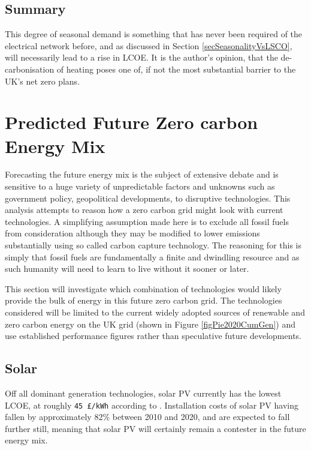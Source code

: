 \documentclass[11pt]{article}
\numberwithin{equation}{section}
\begin{document}
\subsection{Summary}
\label{sec:org576b664}
This degree of seasonal demand is something that has never been required of the electrical network before, and as discussed in Section \ref{secSeasonalityVsLSCO}, will necessarily lead to a rise in LCOE. It is the author's opinion, that the de-carbonisation of heating poses one of, if not the most substantial barrier to the UK's net zero plans.

\section{Predicted Future Zero carbon Energy Mix}
\label{sec:orgb6a7e0b}
Forecasting the future energy mix is the subject of extensive debate and is sensitive to a huge variety of unpredictable factors and unknowns such as government policy, geopolitical developments, to disruptive technologies. This analysis attempts to reason how a zero carbon grid might look with current technologies. A simplifying assumption made here is to exclude all fossil fuels from consideration although they may be modified to lower emissions substantially using so called carbon capture technology. The reasoning for this is simply that fossil fuels are fundamentally a finite and dwindling resource and as such humanity will need to learn to live without it sooner or later.

This section will investigate which combination of technologies would likely provide the bulk of energy in this future zero carbon grid. The technologies considered will be limited to the current widely adopted sources of renewable and zero carbon energy on the UK grid (shown in Figure \ref{figPie2020CumGen}) and use established performance figures rather than speculative future developments.

\subsection{Solar \label{secSolar}}
\label{sec:orgff970f7}
Off all dominant generation technologies, solar PV currently has the lowest LCOE, at roughly \texttt{45 £/kWh} according to \cite{DeptEnerLCOE}. Installation costs of solar PV having fallen by approximately 82\% between 2010 and 2020, and are expected to fall further still, meaning that solar PV will certainly remain a contester in the future energy mix.
\end{document}
